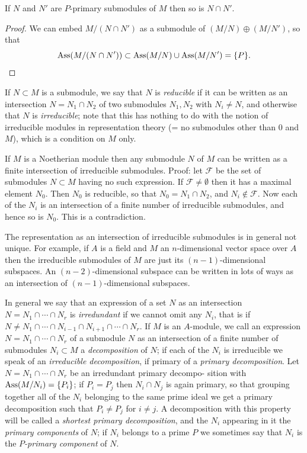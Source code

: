 \begin{theorem}\label{thm:6.7}
If $N$ and $N'$ are $P$-primary submodules of $M$ then so is $N \cap N'$.
\end{theorem}

\begin{proof}
We can embed $M/(N \cap N')$ as a submodule of $(M/N) \oplus (M/N')$, so
that
\[
  \operatorname{Ass}(M/(N \cap N')) \subset \operatorname{Ass}(M/N) \cup \operatorname{Ass}(M/N') = \{P\}.
\]
\end{proof}

If $N \subset M$ is a submodule, we say that $N$ is \emph{reducible} if it can be written as
an intersection $N = N_1 \cap N_2$ of two submodules $N_1, N_2$ with $N_i \neq N$, and
otherwise that $N$ is \emph{irreducible}; note that this has nothing to do with the
notion of irreducible modules in representation theory (= no submodules
other than $0$ and $M$), which is a condition on $M$ only.

If $M$ is a Noetherian module then any submodule $N$ of $M$ can be written
as a finite intersection of irreducible submodules. Proof: let $\mathcal{F}$ be the set
of submodules $N \subset M$ having no such expression. If $\mathcal{F} \neq \emptyset$ then it has a
maximal element $N_0$. Then $N_0$ is reducible, so that $N_0 = N_1 \cap N_2$, and
$N_i \notin \mathcal{F}$. Now each of the $N_i$ is an intersection of a finite number of
irreducible submodules, and hence so is $N_0$. This is a contradiction.

\begin{remark}
The representation as an intersection of irreducible submodules is
in general not unique. For example, if $A$ is a field and $M$ an $n$-dimensional
vector space over $A$ then the irreducible submodules of $M$ are just its
$(n - 1)$-dimensional subspaces. An $(n - 2)$-dimensional subspace can be
written in lots of ways as an intersection of $(n - 1)$-dimensional subspaces.
\end{remark}

In general we say that an expression of a set $N$ as an intersection
$N = N_1 \cap \cdots \cap N_r$ is \emph{irredundant} if we cannot omit any $N_i$, that is if
$N \neq N_1 \cap \cdots \cap N_{i-1} \cap N_{i+1} \cap \cdots \cap N_r$. If $M$ is an $A$-module, we call an
expression $N = N_1 \cap \cdots \cap N_r$ of a submodule $N$ as an intersection of a finite
number of submodules $N_i \subset M$ a \emph{decomposition} of $N$; if each of the $N_i$ is
irreducible we speak of an \emph{irreducible decomposition}, if primary of a \emph{primary decomposition}.
Let $N = N_1 \cap \cdots \cap N_r$ be an irredundant primary decompo-
sition with $\operatorname{Ass}(M/N_i) = \{P_i\}$; if $P_i = P_j$ then $N_i \cap N_j$ is again primary, so
that grouping together all of the $N_i$ belonging to the same prime ideal we get
a primary decomposition such that $P_i \neq P_j$ for $i \neq j$. A decomposition with
this property will be called a \emph{shortest primary decomposition}, and the $N_i$
appearing in it the \emph{primary components} of $N$; if $N_i$ belongs to a prime $P$ we
sometimes say that $N_i$ is the \emph{$P$-primary component} of $N$.

